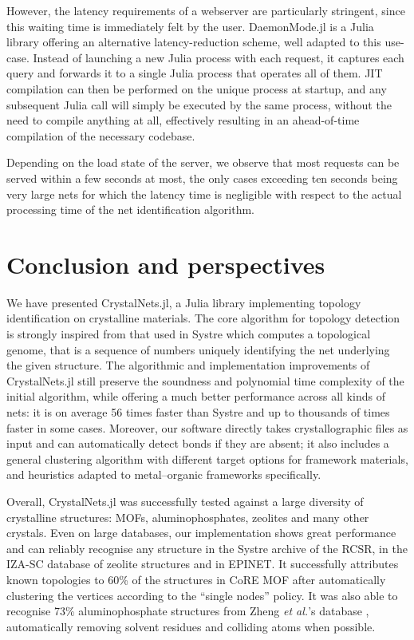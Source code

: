 \documentclass[main.tex]{subfiles}
\begin{document}
However, the latency requirements of a webserver are particularly stringent, since this waiting time is immediately felt by the user. DaemonMode.jl is a Julia library offering an alternative latency-reduction scheme, well adapted to this use-case. Instead of launching a new Julia process with each request, it captures each query and forwards it to a single Julia process that operates all of them. JIT compilation can then be performed on the unique process at startup, and any subsequent Julia call will simply be executed by the same process, without the need to compile anything at all, effectively resulting in an ahead-of-time compilation of the necessary codebase.

Depending on the load state of the server, we observe that most requests can be served within a few seconds at most, the only cases exceeding ten seconds being very large nets for which the latency time is negligible with respect to the actual processing time of the net identification algorithm.

\section{Conclusion and perspectives}

We have presented CrystalNets.jl, a Julia library implementing topology identification on crystalline materials. The core algorithm for topology detection is strongly inspired from that used in Systre \autocite{Systre} which computes a topological genome, that is a sequence of numbers uniquely identifying the net underlying the given structure. The algorithmic and implementation improvements of CrystalNets.jl still preserve the soundness and polynomial time complexity of the initial algorithm, while offering a much better performance across all kinds of nets: it is on average 56 times faster than Systre and up to thousands of times faster in some cases. Moreover, our software directly takes crystallographic files as input and can automatically detect bonds if they are absent; it also includes a general clustering algorithm with different target options for framework materials, and heuristics adapted to metal--organic frameworks specifically.

Overall, CrystalNets.jl was successfully tested against a large diversity of crystalline structures: MOFs, aluminophosphates, zeolites and many other crystals. Even on large databases, our implementation shows great performance and can reliably recognise any structure in the Systre archive of the RCSR, in the IZA-SC database of zeolite structures and in EPINET. It successfully attributes known topologies to {60\%} of the structures in CoRE MOF after automatically clustering the vertices according to the ``single nodes'' policy. It was also able to recognise {73\%} aluminophosphate structures from Zheng \textit{et al.}'s database \autocite{ALPO}, automatically removing solvent residues and colliding atoms when possible.
\end{document}
